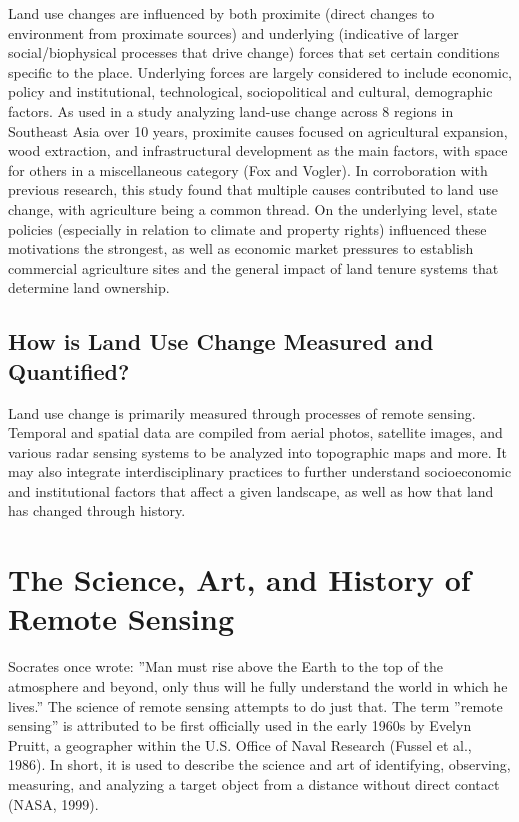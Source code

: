 \documentclass{book}\usepackage{knitr}
\begin{document}
Land use changes are influenced by both proximite (direct changes to environment from proximate sources) and underlying (indicative of larger social/biophysical processes that drive change) forces that set certain conditions specific to the place. Underlying forces are largely considered to include economic, policy and institutional, technological, sociopolitical and cultural, demographic factors. As used in a study analyzing land-use change across 8 regions in Southeast Asia over 10 years, proximite causes focused on agricultural expansion, wood extraction, and infrastructural development as the main factors, with space for others in a miscellaneous category (Fox and Vogler). In corroboration with previous research, this study found that multiple causes contributed to land use change, with agriculture being a common thread. On the underlying level, state policies (especially in relation to climate and property rights) influenced these motivations the strongest, as well as economic market pressures to establish commercial agriculture sites and the general impact of land tenure systems that determine land ownership.

\subsection{How is Land Use Change Measured and Quantified?}

Land use change is primarily measured through processes of remote sensing. Temporal and spatial data are compiled from aerial photos, satellite images, and various radar sensing systems to be analyzed into topographic maps and more. It may also integrate interdisciplinary practices to further understand socioeconomic and institutional factors that affect a given landscape, as well as how that land has changed through history.

\section{The Science, Art, and History of Remote Sensing}

Socrates once wrote: ''Man must rise above the Earth to the top of the atmosphere and beyond, only thus will he fully understand the world in which he lives.'' The science of remote sensing attempts to do just that. The term ''remote sensing'' is attributed to be first officially used in the early 1960s by Evelyn Pruitt, a geographer within the U.S. Office of Naval Research (Fussel et al., 1986). In short, it is used to describe the science and art of identifying, observing, measuring, and analyzing a target object from a distance without direct contact (NASA, 1999). 
\end{document}
